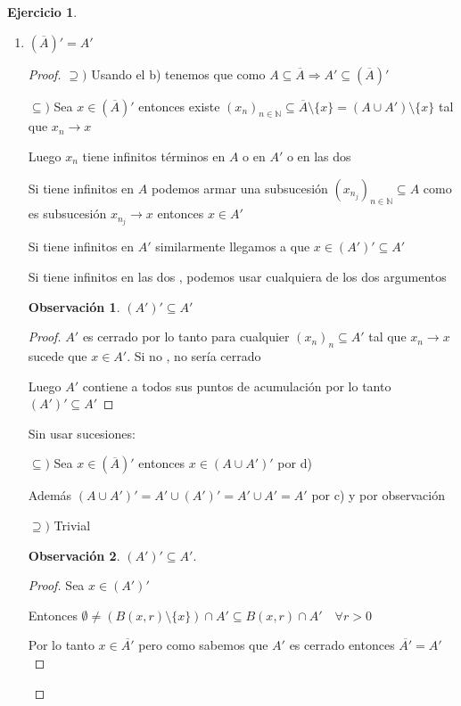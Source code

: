 \documentclass[11pt]{report}
\newcommand{\N}{\mathbb{N}}
\newcommand{\Ra}{\Rightarrow}
\newcommand{\ra}{\rightarrow}
\newcommand{\ol}{\overline}
\theoremstyle{definition}
\newtheorem*{remark}{Observación}
\newtheorem{ej}{Ejercicio}
\begin{document}
\begin{ej}
\begin{enumerate}
\begin{enumerate}
\begin{proof}
	Si $x \notin B(x,r) \cap A\quad \forall r>0$ entonces $\emptyset \neq B(x,r) \cap A = (B(x,r)\setminus \{x\}) \cap A$

	Por lo tanto $x \in A'$ luego $x \in A \cup A'$
	  \end{proof}
	\item $(\ol A)' = A'$
	  \begin{proof}
	$\supseteq )$ Usando el b) tenemos que como $A \subseteq \ol A \Ra A' \subseteq (\ol A)'$

      $\subseteq )$ Sea $x \in (\ol A)'$ entonces existe $(x_n)_{n\in \N} \subseteq \ol A \setminus \{x\}= (A \cup A') \setminus \{x\}$ tal que $x_n \ra x$

    Luego $x_{n}$ tiene infinitos términos en $A$ o en $A'$ o en las dos

  Si tiene infinitos en $A$ podemos armar una subsucesión $(x_{n_{j}})_{n\in \N} \subseteq A$ como es subsucesión $x_{n_j} \ra x$ entonces $x \in A'$

Si tiene infinitos en $A'$ similarmente llegamos a que $x \in (A')' \subseteq A'$

Si tiene infinitos en las dos , podemos usar cualquiera de los dos argumentos

\begin{remark}
 $(A')'\subseteq A'$ 
 \begin{proof}
 $A'$ es cerrado por lo tanto para cualquier $(x_{n})_n \subseteq A'$ tal que $x_n \ra x$ sucede que $x \in A'$. Si no , no sería cerrado 

Luego $A'$ contiene a todos sus puntos de acumulación por lo tanto $(A')' \subseteq A'$
 \end{proof} 
\end{remark}

	Sin usar sucesiones:

	$\subseteq )$ Sea $x \in ( \ol A)'$ entonces $x \in (A\cup A ')'$ por d)

	Además $(A \cup A')'= A'\cup (A') ' = A'\cup A'= A '$ por c) y por observación 

	$\supseteq ) $ Trivial
	\begin{remark}
		$(A') '\subseteq A'$. 
		\begin{proof}
			Sea $x \in (A') '$ 

			Entonces $\emptyset \neq (B(x,r)\setminus\{x\})\cap A'\subseteq B(x,r) \cap A'\quad \forall r>0$ 

			Por lo tanto $x \in \ol{A'}$ pero como sabemos que $A'$ es cerrado entonces $\ol{A'} = A'$


\end{proof}
\end{remark}
\end{proof}
\end{enumerate}
\end{enumerate}
\end{ej}
\end{document}
